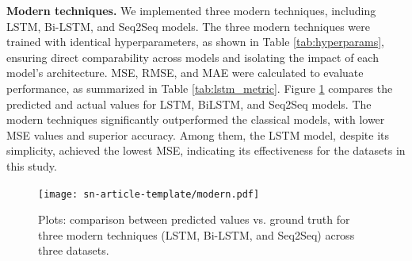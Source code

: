 \documentclass[sn-mathphys-num]{sn-jnl}
\theoremstyle{thmstyleone}%
\theoremstyle{thmstyletwo}%
\theoremstyle{thmstylethree}%
\begin{document}
\textbf{Modern techniques.} 
We implemented three modern techniques, including LSTM, Bi-LSTM, and Seq2Seq models. The three modern techniques were trained with identical hyperparameters, as shown in Table \ref{tab:hyperparams}, ensuring direct comparability across models and isolating the impact of each model's architecture. MSE, RMSE, and MAE were calculated to evaluate performance, as summarized in Table \ref{tab:lstm_metric}. Figure \ref{fig:modern} compares the predicted and actual values for LSTM, BiLSTM, and Seq2Seq models. The modern techniques significantly outperformed the classical models, with lower MSE values and superior accuracy. Among them, the LSTM model, despite its simplicity, achieved the lowest MSE, indicating its effectiveness for the datasets in this study.

\begin{figure}[]
	\begin{center}
		\texttt{[image: sn-article-template/modern.pdf]}
	\end{center}
	\caption{Plots: comparison between predicted values vs. ground truth for three modern techniques (LSTM, Bi-LSTM, and Seq2Seq) across three datasets.}
	\label{fig:modern}
\end{figure}
\end{document}
